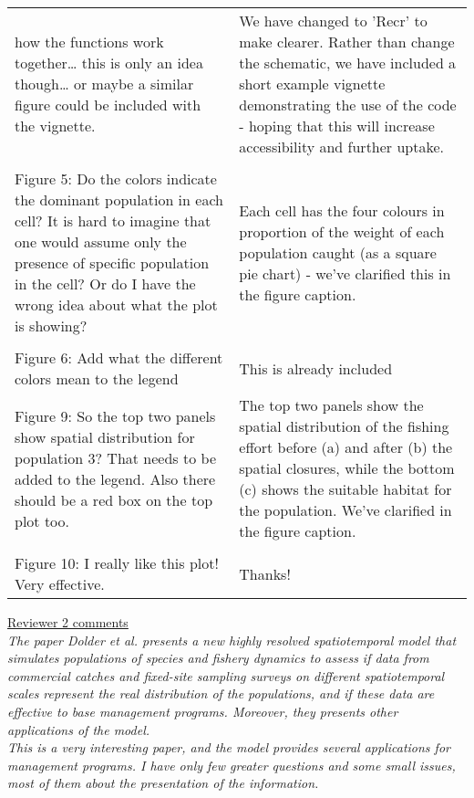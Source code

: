 \documentclass[10pt]{letter}
\begin{document}
\begin{landscape}
\begin{center}
\begin{longtable}{p{12cm} | p{12cm}}
how the functions work together… this is only an idea though… or maybe a
similar figure could be included with the vignette. & We have changed to 'Recr'
to make clearer. Rather than change the schematic, we have included a short
example vignette demonstrating the use of the code - hoping that this will
increase accessibility and further uptake. \\
\\
Figure 5: Do the colors indicate the dominant population in each cell? It is
hard to imagine that one would assume only the presence of specific population
in the cell? Or do I have the wrong idea about what the plot is showing? & Each
cell has the four colours in proportion of the weight of each population caught
(as a square pie chart) - we've clarified this in the figure caption. \\
\\
Figure 6: Add what the different colors mean to the legend & This is already
included \\
Figure 9: So the top two panels show spatial distribution for population 3?
That needs to be added to the legend. Also there should be a red box on the top
plot too. & The top two panels show the spatial distribution of the fishing
effort before (a) and after (b) the spatial closures, while the bottom (c)
shows the suitable habitat for the population. We've clarified in the figure
caption. \\
\\
Figure 10: I really like this plot! Very effective. & Thanks! \\
		\bottomrule
	\end{longtable}

\end{center}

\underline{Reviewer 2 comments} \\

\textit{The paper Dolder et al. presents a new highly resolved spatiotemporal
	model that simulates populations of species and fishery dynamics to
	assess if data from commercial catches and fixed-site sampling surveys
	on different spatiotemporal scales represent the real distribution of
	the populations, and if these data are effective to base  management
	programs. Moreover, they presents other applications of the model.} \\

\textit{This is a very interesting paper, and the model provides several
	applications for management programs. I have only few greater questions
	and some small issues, most of them about the presentation of the
	information.}  \\


\end{landscape}
\end{document}
